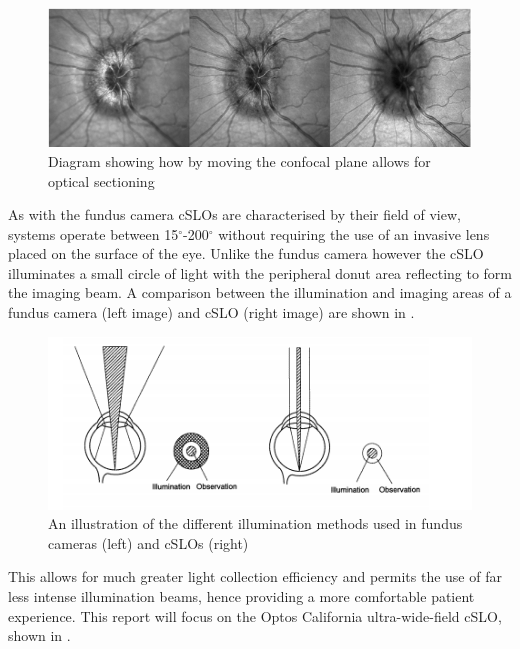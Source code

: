 \begin{figure}[htbp]
\centering
 \includegraphics{figures/confocalimages}
\caption{Diagram showing how by moving the confocal plane allows for optical sectioning}
\label{fig:3dconfocal}
\end{figure}

As with the fundus camera cSLOs are characterised by their field of view,
systems operate between 15$^\circ$-200$^\circ$ without requiring the use of
an invasive lens placed on the surface of the eye. Unlike the fundus camera
however the cSLO illuminates a small circle of light with the peripheral donut
area reflecting to form the imaging beam. A comparison between the illumination
and imaging areas of a fundus camera (left image) and cSLO (right image) are
shown in  .


\begin{figure}[htbp]
\centering
 \includegraphics{figures/illumination}
\caption{An illustration of the different illumination methods used in fundus cameras (left) and cSLOs (right)}
\label{fig:illum}
    \end{figure}


This allows for much greater light collection efficiency and permits the use
of far less intense illumination beams, hence providing a more comfortable
patient experience.\cite{5_bennett_2015} This report will focus on the Optos
California ultra-wide-field cSLO, shown in .

